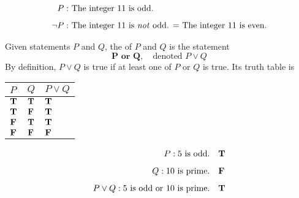 \vspace*{1em}

\begin{example}
\begin{align*}
P:&\text{ The integer $11$ is odd.}\\[0.5em]
\neg P:&\text{ The integer $11$ is \emph{not} odd. $=$ The integer $11$ is even.}
\end{align*}
\end{example}

\vspace*{1em}

\begin{definition}[Disjunction]
Given statements $P$ and $Q$, the  of $P$ and $Q$ is the statement \[\textbf{$\mathbold{P}$ or $\mathbold{Q}$},\quad \text{denoted $P \vee Q$}\] By definition, $P \vee Q$ is true if at least one of $P$ or $Q$ is true. Its truth table is
\begin{center}
{\renewcommand{\arraystretch}{1.5}%
\begin{tabular}{|>{\centering}m{1cm}|>{\centering}m{1cm}|>{\centering\arraybackslash}m{1cm}|}
\hline
\rowcolor{lightgrey}
$P$ & $Q$ & $P\vee Q$\\
\hline
$\mathbf{T}$ & $\mathbf{T}$ & $\mathbf{T}$\\
\hline
$\mathbf{T}$ & $\mathbf{F}$ & $\mathbf{T}$\\
\hline
$\mathbf{F}$ & $\mathbf{T}$ & $\mathbf{T}$\\
\hline
$\mathbf{F}$ & $\mathbf{F}$ & $\mathbf{F}$\\
\hline
\end{tabular}
}
\end{center}
\end{definition}


\begin{example}
\begin{align*}
P:\text{$5$ is odd.} &\quad\mathbf{T}\\[0.5em]
Q:\text{$10$ is prime.} &\quad\mathbf{F}\\[0.5em]
P\vee Q:\text{$5$ is odd or $10$ is prime.} &\quad\mathbf{T}
\end{align*}
\end{example}

\vspace*{1em}

